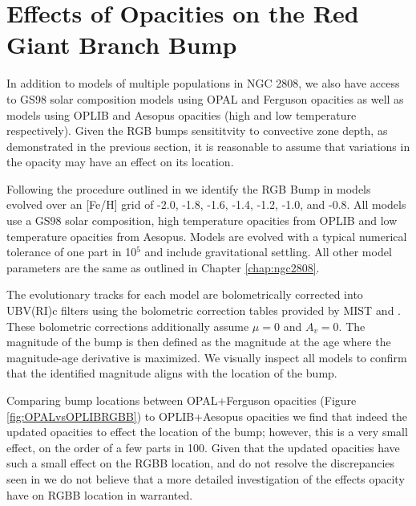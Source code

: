 \section{Effects of Opacities on the Red Giant Branch Bump}
In addition to models of multiple populations in NGC 2808, we also have access
to GS98 solar composition models using OPAL and Ferguson opacities as well as
models using OPLIB and Aesopus opacities (high and low temperature
respectively). Given the RGB bumps sensititvity to convective zone depth, as
demonstrated in the previous section, it is reasonable to assume that
variations in the opacity may have an effect on its location. 

Following the procedure outlined in \citep{Joyce2016} we identify the RGB Bump
in models evolved over an [Fe/H] grid of -2.0, -1.8, -1.6, -1.4, -1.2, -1.0,
and -0.8. All models use a GS98 solar composition, high temperature opacities
from OPLIB and low temperature opacities from Aesopus. Models are evolved with
a typical numerical tolerance of one part in 10$^{5}$ and include gravitational
settling. All other model parameters are the same as outlined in Chapter \ref{chap:ngc2808}. 

The evolutionary tracks for each model are bolometrically corrected into
UBV(RI)c filters using the bolometric correction tables provided by MIST
\citep{Choi2016} and \fidanka. These bolometric corrections additionally assume $\mu =
0$ and $A_{v} = 0$. The magnitude of the bump is then defined as the magnitude
at the age where the magnitude-age derivative is maximized. We visually inspect
all models to confirm that the identified magnitude aligns with the location of
the bump.

Comparing bump locations between OPAL+Ferguson opacities (Figure
\ref{fig:OPALvsOPLIBRGBB}) to OPLIB+Aesopus opacities we find that indeed the
updated opacities to effect the location of the bump; however, this is a very
small effect, on the order of a few parts in 100. Given that the updated
opacities have such a small effect on the RGBB location, and do not resolve the
discrepancies seen in \citet{Joyce2016} we do not believe that a more detailed
investigation of the effects opacity have on RGBB location in warranted.


